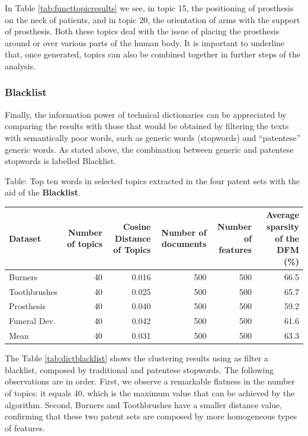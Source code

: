 \documentclass[]{book}
\begin{document}
In Table \ref{tab:functtopicresults} we see, in topic 15, the
positioning of prosthesis on the neck of patients, and in topic 20, the
orientation of arms with the support of prosthesis. Both these topics
deal with the issue of placing the prosthesis around or over various
parts of the human body. It is important to underline that, once
generated, topics can also be combined together in further steps of the
analysis.

\subsubsection*{Blacklist}\label{blacklist}

Finally, the information power of technical dictionaries can be
appreciated by comparing the results with those that would be obtained
by filtering the texts with semantically poor words, such as generic
words (stopwords) and ``patentese'' generic words. As stated above, the
combination between generic and patentese stopwords is labelled
Blacklist.

Table: \label{tab:dictblacklist} Top ten words in selected topics extracted
in the four patent sets with the aid of the \textbf{Blacklist}.

\begin{tabular}{l|r|r|r|r|r}
\hline
Dataset & Number of topics & Cosine Distance of Topics & Number of documents & Number of features & Average sparsity of the DFM (\%)\\
\hline
Burners & 40 & 0.016 & 500 & 500 & 66.5\\
\hline
Toothbrushes & 40 & 0.025 & 500 & 500 & 65.7\\
\hline
Prosthesis & 40 & 0.040 & 500 & 500 & 59.2\\
\hline
Funeral Dev. & 40 & 0.042 & 500 & 500 & 61.6\\
\hline
Mean & 40 & 0.031 & 500 & 500 & 63.3\\
\hline
\end{tabular}

The Table \ref{tab:dictblacklist} shows the clustering results using as
filter a blacklist, composed by traditional and patentese stopwords. The
following observations are in order. First, we observe a remarkable
flatness in the number of topics: it equals 40, which is the maximum
value that can be achieved by the algorithm. Second, Burners and
Toothbrushes have a smaller distance value, confirming that these two
patent sets are composed by more homogeneous types of features.
\end{document}
